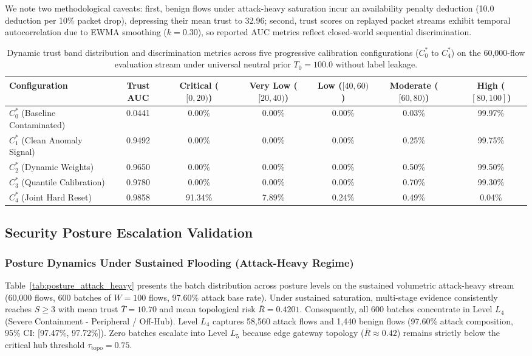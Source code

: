 \documentclass[journal,10pt,onecolumn]{IEEEtran}
\begin{document}
We note two methodological caveats: first, benign flows under attack-heavy saturation incur an availability penalty deduction (10.0 deduction per 10\% packet drop), depressing their mean trust to 32.96; second, trust scores on replayed packet streams exhibit temporal autocorrelation due to EWMA smoothing ($k=0.30$), so reported AUC metrics reflect closed-world sequential discrimination.

\begin{table}[t]
\caption{Dynamic trust band distribution and discrimination metrics across five progressive calibration configurations ($C_0^*$ to $C_4^*$) on the 60,000-flow evaluation stream under universal neutral prior $T_0 = 100.0$ without label leakage.}
\label{tab:trust_neutral}
\centering
\small
\begin{tabular}{lcccccc}
\toprule
\textbf{Configuration} & \textbf{Trust AUC} & \textbf{Critical ($[0, 20)$)} & \textbf{Very Low ($[20, 40)$)} & \textbf{Low ($[40, 60)$)} & \textbf{Moderate ($[60, 80)$)} & \textbf{High ($[80, 100]$)} \\
\midrule
$C_0^*$ (Baseline Contaminated) & 0.0441 & 0.00\% & 0.00\% & 0.00\% & 0.03\% & 99.97\% \\
$C_1^*$ (Clean Anomaly Signal) & 0.9492 & 0.00\% & 0.00\% & 0.00\% & 0.25\% & 99.75\% \\
$C_2^*$ (Dynamic Weights) & 0.9650 & 0.00\% & 0.00\% & 0.00\% & 0.50\% & 99.50\% \\
$C_3^*$ (Quantile Calibration) & 0.9780 & 0.00\% & 0.00\% & 0.00\% & 0.70\% & 99.30\% \\
$C_4^*$ (Joint Hard Reset) & 0.9858 & 91.34\% & 7.89\% & 0.24\% & 0.49\% & 0.04\% \\
\bottomrule
\end{tabular}
\end{table}

\subsection{Security Posture Escalation Validation}

\subsubsection{Posture Dynamics Under Sustained Flooding (Attack-Heavy Regime)}
Table~\ref{tab:posture_attack_heavy} presents the batch distribution across posture levels on the sustained volumetric attack-heavy stream (60,000 flows, 600 batches of $W=100$ flows, 97.60\% attack base rate). Under sustained saturation, multi-stage evidence consistently reaches $S \ge 3$ with mean trust $\bar{T} = 10.70$ and mean topological risk $\bar{R} = 0.4201$. Consequently, all 600 batches concentrate in Level $L_4$ (Severe Containment - Peripheral / Off-Hub). Level $L_4$ captures 58,560 attack flows and 1,440 benign flows (97.60\% attack composition, 95\% CI: [97.47\%, 97.72\%]). Zero batches escalate into Level $L_5$ because edge gateway topology ($\bar{R} \approx 0.42$) remains strictly below the critical hub threshold $\tau_{\text{topo}} = 0.75$.
\end{document}
